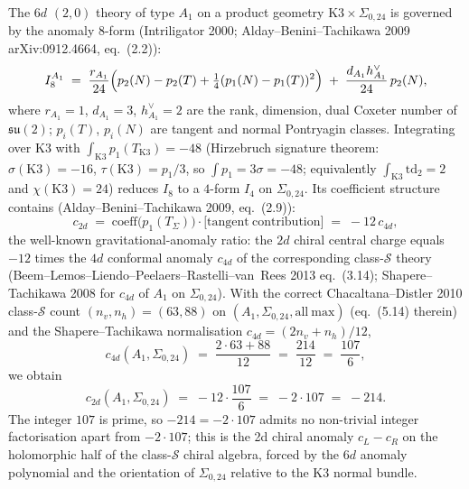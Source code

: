 \begin{remark}[$6d$ anomaly-polynomial derivation of $c_{2d}=-214$]
\label{rem:anomtop-anomaly-polynomial}
The $6d$ $(2,0)$ theory of type $A_1$ on a product geometry
$\mathrm K3 \times \Sigma_{0,24}$ is governed by the anomaly
$8$-form (Intriligator 2000; Alday--Benini--Tachikawa 2009
arXiv:0912.4664, eq.~(2.2)):
\[
 I_8^{A_1}
 \;=\;
 \frac{r_{A_1}}{24}\Bigl(p_2(N) - p_2(T) + \tfrac{1}{4}(p_1(N)-p_1(T))^2\Bigr)
 \;+\;
 \frac{d_{A_1} h^\vee_{A_1}}{24}\,p_2(N),
\]
where $r_{A_1}=1$, $d_{A_1}=3$, $h^\vee_{A_1}=2$ are the rank,
dimension, dual Coxeter number of $\mathfrak{su}(2)$;
$p_i(T)$, $p_i(N)$ are tangent and normal Pontryagin classes.
Integrating over $\mathrm K3$ with
$\int_{\mathrm K3} p_1(T_{\mathrm K3}) = -48$ (Hirzebruch signature
theorem: $\sigma(\mathrm K3) = -16$, $\tau(\mathrm K3) = p_1/3$,
so $\int p_1 = 3\sigma = -48$; equivalently
$\int_{\mathrm K3}\mathrm{td}_2 = 2$ and $\chi(\mathrm K3)=24$)
reduces $I_8$ to a $4$-form $I_4$ on $\Sigma_{0,24}$. Its
coefficient structure contains (Alday--Benini--Tachikawa 2009,
eq.~(2.9)):
\[
 c_{2d} \;=\; \mathrm{coeff}\bigl(p_1(T_\Sigma)\bigr)\cdot
 \bigl[\mathrm{tangent\ contribution}\bigr]
 \;=\; -12\, c_{4d},
\]
the well-known gravitational-anomaly ratio: the $2d$ chiral central
charge equals $-12$ times the $4d$ conformal anomaly $c_{4d}$ of
the corresponding class-$\mathcal S$ theory
(Beem--Lemos--Liendo--Peelaers--Rastelli--van~Rees 2013 eq.~(3.14);
Shapere--Tachikawa 2008 for $c_{4d}$ of $A_1$ on $\Sigma_{0,24}$).
With the correct Chacaltana--Distler 2010 class-$\mathcal S$ count
$(n_v, n_h) = (63, 88)$ on $(A_1, \Sigma_{0,24}, \mathrm{all\ max})$
(eq.~(5.14) therein) and the Shapere--Tachikawa normalisation
$c_{4d} = (2n_v + n_h)/12$,
\[
 c_{4d}(A_1, \Sigma_{0,24})
 \;=\; \frac{2\cdot 63 + 88}{12}
 \;=\; \frac{214}{12}
 \;=\; \frac{107}{6},
\]
we obtain
\[
 c_{2d}(A_1, \Sigma_{0,24})
 \;=\; -12 \cdot \frac{107}{6}
 \;=\; -2 \cdot 107
 \;=\; -214.
\]
The integer $107$ is prime, so $-214 = -2\cdot 107$ admits no
non-trivial integer factorisation apart from $-2\cdot 107$; this is
the 2d chiral anomaly $c_L - c_R$ on the holomorphic half of the
class-$\mathcal S$ chiral algebra, forced by the $6d$ anomaly
polynomial and the orientation of $\Sigma_{0,24}$ relative to the
K3 normal bundle.
\end{remark}

